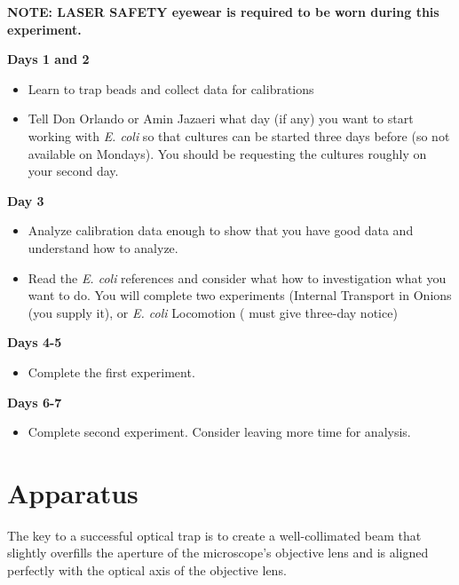 \documentclass{../lab}
\begin{document}
\textbf{NOTE: LASER  SAFETY eyewear is required to be worn during this experiment.}

\textbf{Days 1 and 2}

\begin{itemize}
    \item Learn to trap beads and collect data for calibrations

    \item Tell Don Orlando or Amin Jazaeri what day (if any) you want to start working with \emph{E. coli} so that cultures can be started three days before (so not available on Mondays). You should be requesting the cultures roughly on your second day.
\end{itemize}

\textbf{Day 3}

\begin{itemize}
    \item Analyze calibration data enough to show that you have good data and understand how to analyze.

    \item Read the \emph{E. coli}  references and consider what how to investigation what you want to do. You will complete two experiments (Internal Transport in Onions (you supply it), or \emph{E. coli} Locomotion ( must give three-day notice)
\end{itemize}

\textbf{Days 4-5}

\begin{itemize}
    \item Complete the first experiment.
\end{itemize}

\textbf{Days 6-7}

\begin{itemize}
    \item Complete second experiment. Consider leaving more time for analysis.
\end{itemize}

\section{Apparatus}

The key to a successful optical trap is to create a well-collimated beam that slightly overfills the aperture of the microscope's objective lens and is aligned perfectly with the optical axis of the objective lens.
\end{document}
